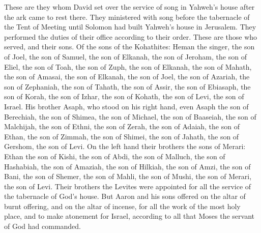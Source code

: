 \begin{paracol}{2}
\begin{otherlanguage}{english}
 These are they whom David set over the service of song
in Yahweh's house after the ark came to rest there.  They
ministered with song before the tabernacle of the Tent of Meeting until
Solomon had built Yahweh's house in Jerusalem. They performed the duties
of their office according to their order.  These are
those who served, and their sons. Of the sons of the Kohathites: Heman
the singer, the son of Joel, the son of Samuel,  the son
of Elkanah, the son of Jeroham, the son of Eliel, the son of Toah,
 the son of Zuph, the son of Elkanah, the son of Mahath,
the son of Amasai,  the son of Elkanah, the son of Joel,
the son of Azariah, the son of Zephaniah,  the son of
Tahath, the son of Assir, the son of Ebiasaph, the son of Korah,
 the son of Izhar, the son of Kohath, the son of Levi,
the son of Israel.  His brother Asaph, who stood on his
right hand, even Asaph the son of Berechiah, the son of Shimea,
 the son of Michael, the son of Baaseiah, the son of
Malchijah,  the son of Ethni, the son of Zerah, the son
of Adaiah,  the son of Ethan, the son of Zimmah, the son
of Shimei,  the son of Jahath, the son of Gershom, the
son of Levi.  On the left hand their brothers the sons of
Merari: Ethan the son of Kishi, the son of Abdi, the son of Malluch,
 the son of Hashabiah, the son of Amaziah, the son of
Hilkiah,  the son of Amzi, the son of Bani, the son of
Shemer,  the son of Mahli, the son of Mushi, the son of
Merari, the son of Levi.  Their brothers the Levites were
appointed for all the service of the tabernacle of God's house.
 But Aaron and his sons offered on the altar of burnt
offering, and on the altar of incense, for all the work of the most holy
place, and to make atonement for Israel, according to all that Moses the
servant of God had commanded.


\end{otherlanguage}
\end{paracol}
